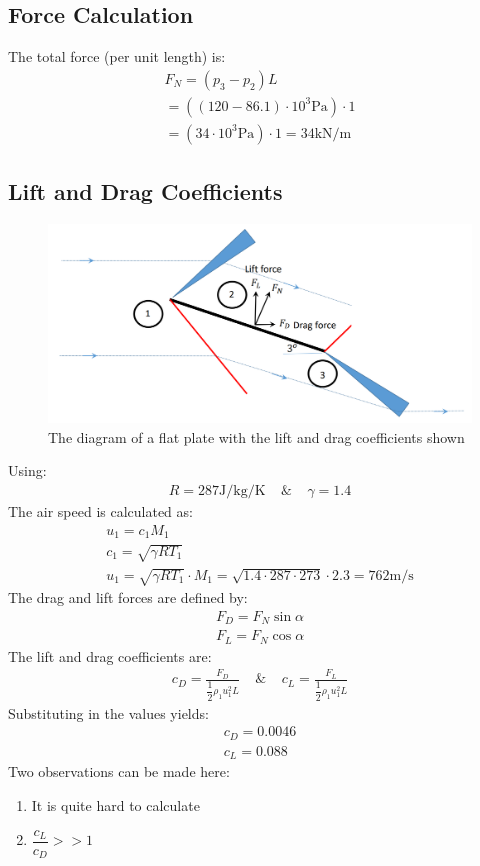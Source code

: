 \subsection{Force Calculation}
The total force (per unit length) is:
\begin{gather}
    F_N = (p_3-p_2)L \\[5pt]
    = ((120-86.1)\cdot 10^3 \si{\pascal}) \cdot 1 \\[5pt]
    = (34\cdot 10^3\si{\pascal})\cdot 1
    = 34\si{\kilo\newton\per\metre}
\end{gather}
\subsection{Lift and Drag Coefficients}
\begin{figure}[H]
    \centering
    \includegraphics[width = 0.95 \textwidth]{./img/diagram33.png}
    \caption{The diagram of a flat plate with the lift and drag coefficients shown}
\end{figure}
Using:
\begin{gather}
    R = 287\si{\joule\per\kilogram\per\kelvin} \ \ \ \ \ \& \ \ \ \ \
    \gamma = 1.4
\end{gather}
The air speed is calculated as:
\begin{gather}
    u_1 = c_1 M_1 \\[5pt]
    c_1 = \sqrt{\gamma R T_1} \\[5pt]
    u_1 = \sqrt{\gamma R T_1} \cdot M_1 = \sqrt{1.4\cdot 287\cdot 273}\cdot 2.3 = 762 \si{\metre\per\second}
\end{gather}
The drag and lift forces are defined by:
\begin{gather}
    F_D = F_N \sin\alpha \\[5pt]
    F_L = F_N \cos\alpha
\end{gather}
The lift and drag coefficients are:
\begin{gather}
    c_D = \frac{F_D}{\dfrac{1}{2}\rho_1 u_1^2 L} \ \ \ \ \ \& \ \ \ \ \
    c_L = \frac{F_L}{\dfrac{1}{2}\rho_1 u_1^2 L}
\end{gather}
Substituting in the values yields:
\begin{gather}
    c_D = 0.0046 \\[5pt]
    c_L = 0.088
\end{gather}
Two observations can be made here:
\begin{enumerate}[noitemsep]
    \item It is quite hard to calculate
    \item $\dfrac{c_L}{c_D}>>1$
\end{enumerate}
